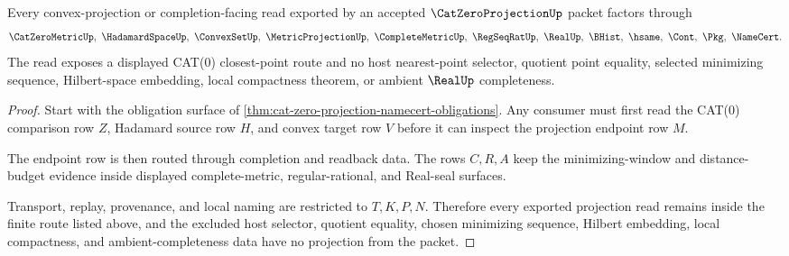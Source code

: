\begin{theorem}
\label{thm:cat-zero-projection-nonescape}
Every convex-projection or completion-facing read exported by an accepted $\CatZeroProjectionUp$ packet factors through
$$
\CatZeroMetricUp,\ \HadamardSpaceUp,\ \ConvexSetUp,\ \MetricProjectionUp,\ \CompleteMetricUp,\ \RegSeqRatUp,\ \RealUp,\ \BHist,\ \hsame,\ \Cont,\ \Pkg,\ \NameCert .
$$
The read exposes a displayed CAT(0) closest-point route and no host nearest-point selector, quotient point equality, selected minimizing sequence, Hilbert-space embedding, local compactness theorem, or ambient $\RealUp$ completeness.
\end{theorem}
\begin{proof}
Start with the obligation surface of \autoref{thm:cat-zero-projection-namecert-obligations}. Any consumer must first read the CAT(0) comparison row $Z$, Hadamard source row $H$, and convex target row $V$ before it can inspect the projection endpoint row $M$.

The endpoint row is then routed through completion and readback data. The rows $C,R,A$ keep the minimizing-window and distance-budget evidence inside displayed complete-metric, regular-rational, and Real-seal surfaces.

Transport, replay, provenance, and local naming are restricted to $T,K,P,N$. Therefore every exported projection read remains inside the finite route listed above, and the excluded host selector, quotient equality, chosen minimizing sequence, Hilbert embedding, local compactness, and ambient-completeness data have no projection from the packet.
\end{proof}



